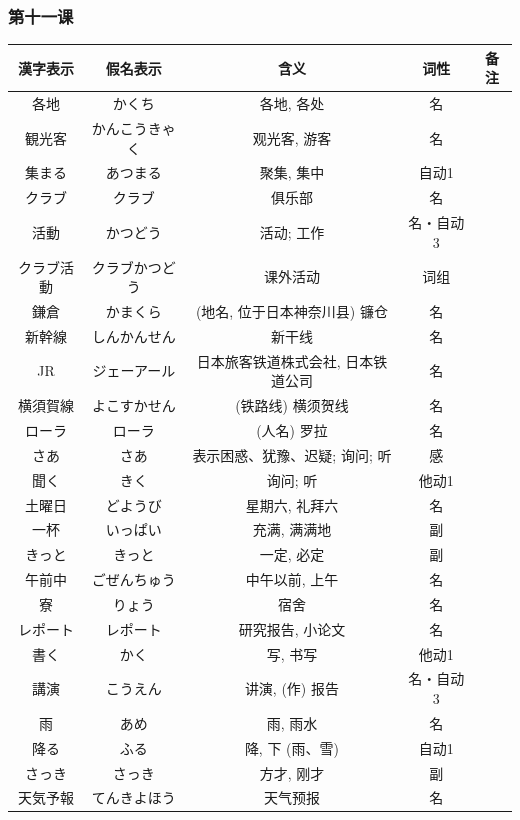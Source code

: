 \subsubsection{第十一课}
\begin{longtable}{|c|c|c|c|c|}
    \hline
漢字表示 & 假名表示  & 含义 & 词性 & 备注 \\ \hline\hline  
各地 & かくち & 各地, 各处 & 名 & \\ \hline
観光客 & かんこうきゃく & 观光客, 游客 & 名 & \\ \hline
集まる & あつまる & 聚集, 集中 & 自动1 & \\ \hline
クラブ & クラブ & 俱乐部 & 名 & \\ \hline
活動 & かつどう & 活动; 工作 & 名・自动3 & \\ \hline
クラブ活動 & クラブかつどう & 课外活动 & 词组 & \\ \hline
鎌倉 & かまくら & (地名, 位于日本神奈川县) 镰仓 & 名 & \\ \hline
新幹線 & しんかんせん & 新干线 & 名 & \\ \hline
JR & ジェーアール & 日本旅客铁道株式会社, 日本铁道公司 & 名 & \\ \hline
横須賀線 & よこすかせん & (铁路线) 横须贺线 & 名 & \\ \hline
ローラ & ローラ & (人名) 罗拉 & 名 & \\ \hline
さあ & さあ & 表示困惑、犹豫、迟疑; 询问; 听 & 感 & \\ \hline
聞く & きく & 询问; 听 & 他动1 & \\ \hline
土曜日 & どようび & 星期六, 礼拜六 & 名 & \\ \hline
一杯 & いっぱい & 充满, 满满地 & 副 & \\ \hline
きっと & きっと & 一定, 必定 & 副 & \\ \hline
午前中 & ごぜんちゅう & 中午以前, 上午 & 名 & \\ \hline
寮 & りょう & 宿舍 & 名 & \\ \hline
レポート & レポート & 研究报告, 小论文 & 名 & \\ \hline
書く & かく & 写, 书写 & 他动1 & \\ \hline
講演 & こうえん & 讲演, (作) 报告 & 名・自动3 & \\ \hline
雨 & あめ & 雨, 雨水 & 名 & \\ \hline
降る & ふる & 降, 下 (雨、雪) & 自动1 & \\ \hline
さっき & さっき & 方才, 刚才 & 副 & \\ \hline
天気予報 & てんきよほう & 天气预报 & 名 & \\ \hline

\end{longtable}

